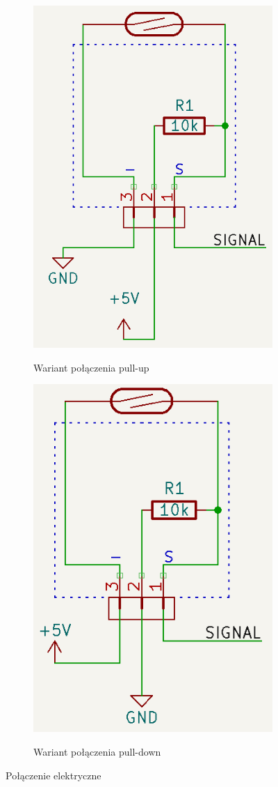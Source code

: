\documentclass[11pt, a4paper]{article}
\begin{document}
\vspace{0.5cm}
\begin{figure}[H]
\centering
\begin{subfigure}{.5\textwidth}
  \centering
  \includegraphics[width=.5\linewidth]{fig/Kontaktron-KY-021/polaczenie_modulu/podciagajacy.png}
  \label{fig:sub1}
  \caption{Wariant połączenia pull-up}
\end{subfigure}%
\begin{subfigure}{.5\textwidth}
  \centering
  \includegraphics[width=.5\linewidth]{fig/Kontaktron-KY-021/polaczenie_modulu/sciagajacy.png}
  \label{fig:sub2}
  \caption{Wariant połączenia pull-down}
\end{subfigure}
\caption{Połączenie elektryczne}
\label{fig:test}
\end{figure}
\vspace{0.5cm}
\end{document}
